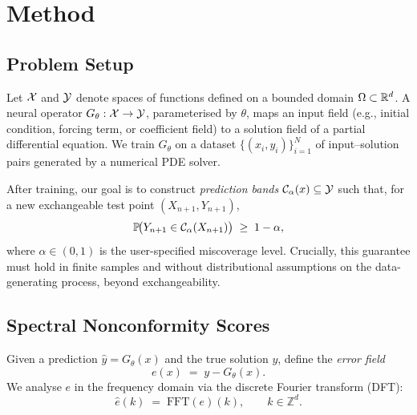 
\section{Method}
\label{sec:method}

\subsection{Problem Setup}
\label{sec:method:setup}

Let $\mathcal{X}$ and $\mathcal{Y}$ denote spaces of functions defined on a bounded domain
$\Omega \subset \mathbb{R}^d$.  A neural operator $G_\theta : \mathcal{X} \to \mathcal{Y}$,
parameterised by $\theta$, maps an input field (e.g., initial condition,
forcing term, or coefficient field) to a solution field of a partial
differential equation.  We train $G_\theta$ on a dataset
$\{(x_i, y_i)\}_{i=1}^{N}$ of input--solution pairs generated by a
numerical PDE solver.

After training, our goal is to construct \emph{prediction bands}
$\mathcal{C}_\alpha(x) \subseteq \mathcal{Y}$ such that, for a new exchangeable test
point $(X_{n+1}, Y_{n+1})$,
\begin{equation}
  \label{eq:coverage}
  \mathbb{P}\!\bigl(Y_{n+1} \in \mathcal{C}_\alpha(X_{n+1})\bigr) \;\geq\; 1 - \alpha,
\end{equation}
where $\alpha \in (0,1)$ is the user-specified miscoverage level.
Crucially, this guarantee must hold in finite samples and without
distributional assumptions on the data-generating process, beyond
exchangeability.

\subsection{Spectral Nonconformity Scores}
\label{sec:method:scores}

Given a prediction $\hat{y} = G_\theta(x)$ and the true solution $y$,
define the \emph{error field}
\begin{equation}
  e(x) \;=\; y - G_\theta(x).
\end{equation}
We analyse $e$ in the frequency domain via the discrete Fourier transform
(DFT):
\begin{equation}
  \hat{e}(k) \;=\; \mathrm{FFT}(e)(k), \qquad k \in \mathbb{Z}^d.
\end{equation}

